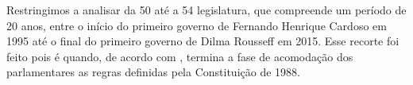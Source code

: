 
Restringimos a analisar da 50\textordfeminine{} até a 54\textordfeminine{}
legislatura, que compreende um período de 20 anos, entre o início do primeiro
governo de Fernando Henrique Cardoso em 1995 até o final do primeiro governo de
Dilma Rousseff em 2015. Esse recorte foi feito pois é quando, de acordo com
\cite{Freitas2008}, termina a fase de acomodação dos parlamentares as regras
definidas pela Constituição de 1988.

